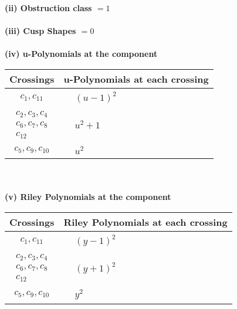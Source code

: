 \documentclass[1p]{elsarticle_modified}
\theoremstyle{definition}
\begin{document}
\flushleft \textbf{(ii) Obstruction class $= 1$}\\~\\
\flushleft \textbf{(iii) Cusp Shapes $= 0$}\\~\\
\newpage\renewcommand{\arraystretch}{1}
\flushleft \textbf{(iv) u-Polynomials at the component}\newline \\
\begin{tabular}{m{50pt}|m{274pt}}
Crossings & \hspace{64pt}u-Polynomials at each crossing \\
\hline $$\begin{aligned}c_{1},c_{11}\end{aligned}$$&$\begin{aligned}
&(u-1)^2
\end{aligned}$\\
\hline $$\begin{aligned}c_{2},c_{3},c_{4}\\c_{6},c_{7},c_{8}\\c_{12}\end{aligned}$$&$\begin{aligned}
&u^2+1
\end{aligned}$\\
\hline $$\begin{aligned}c_{5},c_{9},c_{10}\end{aligned}$$&$\begin{aligned}
&u^2
\end{aligned}$\\
\hline
\end{tabular}\\~\\
\newpage\renewcommand{\arraystretch}{1}
\flushleft \textbf{(v) Riley Polynomials at the component}\newline \\
\begin{tabular}{m{50pt}|m{274pt}}
Crossings & \hspace{64pt}Riley Polynomials at each crossing \\
\hline $$\begin{aligned}c_{1},c_{11}\end{aligned}$$&$\begin{aligned}
&(y-1)^2
\end{aligned}$\\
\hline $$\begin{aligned}c_{2},c_{3},c_{4}\\c_{6},c_{7},c_{8}\\c_{12}\end{aligned}$$&$\begin{aligned}
&(y+1)^2
\end{aligned}$\\
\hline $$\begin{aligned}c_{5},c_{9},c_{10}\end{aligned}$$&$\begin{aligned}
&y^2
\end{aligned}$\\
\hline
\end{tabular}\\~\\
\end{document}
